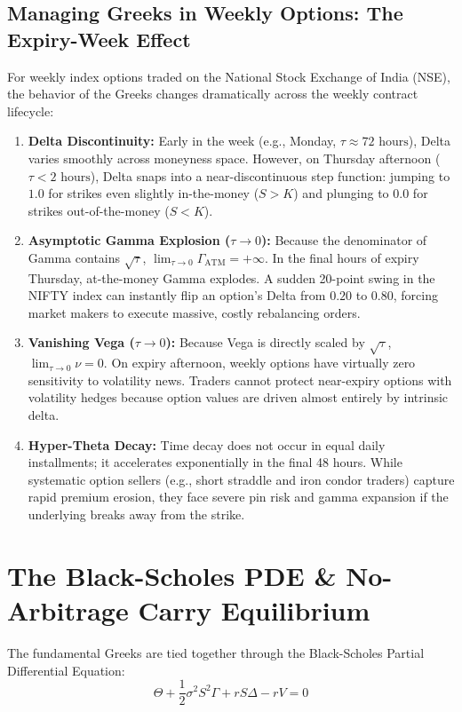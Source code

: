 \subsection{Managing Greeks in Weekly Options: The Expiry-Week Effect}
\label{subsec:weekly_expiry_dynamics}

For weekly index options traded on the National Stock Exchange of India (NSE), the behavior of the Greeks changes dramatically across the weekly contract lifecycle:
\begin{enumerate}
    \item \textbf{Delta Discontinuity:} Early in the week (e.g., Monday, $\tau \approx 72\text{ hours}$), Delta varies smoothly across moneyness space. However, on Thursday afternoon ($\tau < 2\text{ hours}$), Delta snaps into a near-discontinuous step function: jumping to $1.0$ for strikes even slightly in-the-money ($S > K$) and plunging to $0.0$ for strikes out-of-the-money ($S < K$).
    \item \textbf{Asymptotic Gamma Explosion ($\tau \to 0$):} Because the denominator of Gamma contains $\sqrt{\tau}$, $\lim_{\tau \to 0} \Gamma_{\text{ATM}} = +\infty$. In the final hours of expiry Thursday, at-the-money Gamma explodes. A sudden 20-point swing in the NIFTY index can instantly flip an option's Delta from $0.20$ to $0.80$, forcing market makers to execute massive, costly rebalancing orders.
    \item \textbf{Vanishing Vega ($\tau \to 0$):} Because Vega is directly scaled by $\sqrt{\tau}$, $\lim_{\tau \to 0} \nu = 0$. On expiry afternoon, weekly options have virtually zero sensitivity to volatility news. Traders cannot protect near-expiry options with volatility hedges because option values are driven almost entirely by intrinsic delta.
    \item \textbf{Hyper-Theta Decay:} Time decay does not occur in equal daily installments; it accelerates exponentially in the final 48 hours. While systematic option sellers (e.g., short straddle and iron condor traders) capture rapid premium erosion, they face severe pin risk and gamma expansion if the underlying breaks away from the strike.
\end{enumerate}

\section{The Black-Scholes PDE \& No-Arbitrage Carry Equilibrium}
\label{sec:bsm_pde_equilibrium}

The fundamental Greeks are tied together through the Black-Scholes Partial Differential Equation:
\begin{equation}
    \Theta + \frac{1}{2} \sigma^2 S^2 \Gamma + r S \Delta - r V = 0
    \label{eq:master_greek_pde}
\end{equation}

